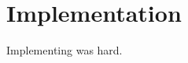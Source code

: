 \documentclass[Thesis.tex]{subfiles}
\begin{document}
\chapter{Implementation}
\label{chp:implementation}

Implementing was hard.
\end{document}
